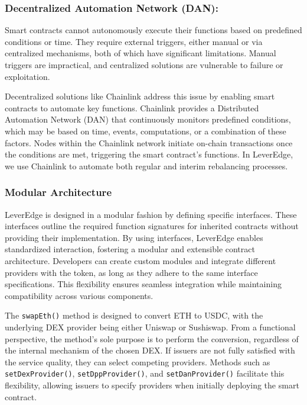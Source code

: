 \subsubsection{Decentralized Automation Network (DAN):} Smart contracts cannot autonomously execute their functions based on predefined conditions or time. They require external triggers, either manual or via centralized mechanisms, both of which have significant limitations. Manual triggers are impractical, and centralized solutions are vulnerable to failure or exploitation. 

Decentralized solutions like Chainlink address this issue by enabling smart contracts to automate key functions. Chainlink provides a Distributed Automation Network (DAN) that continuously monitors predefined conditions, which may be based on time, events, computations, or a combination of these factors. Nodes within the Chainlink network initiate on-chain transactions once the conditions are met, triggering the smart contract’s functions. In LeverEdge, we use Chainlink to automate both regular and interim rebalancing processes.

\subsubsection{Modular Architecture}
LeverEdge is designed in a modular fashion by defining specific interfaces. These interfaces outline the required function signatures for inherited contracts without providing their implementation. By using interfaces, LeverEdge enables standardized interaction, fostering a modular and extensible contract architecture. Developers can create custom modules and integrate different providers with the token, as long as they adhere to the same interface specifications. This flexibility ensures seamless integration while maintaining compatibility across various components.

\begin{example}\label{ex:swap}
	The \texttt{swapEth()} method is designed to convert ETH to USDC, with the underlying DEX provider being either Uniswap or Sushiswap. From a functional perspective, the method’s sole purpose is to perform the conversion, regardless of the internal mechanism of the chosen DEX. If issuers are not fully satisfied with the service quality, they can select competing providers. Methods such as \texttt{setDexProvider()}, \texttt{setDppProvider()}, and \texttt{setDanProvider()} facilitate this flexibility, allowing issuers to specify providers when initially deploying the smart contract. 
\end{example}

